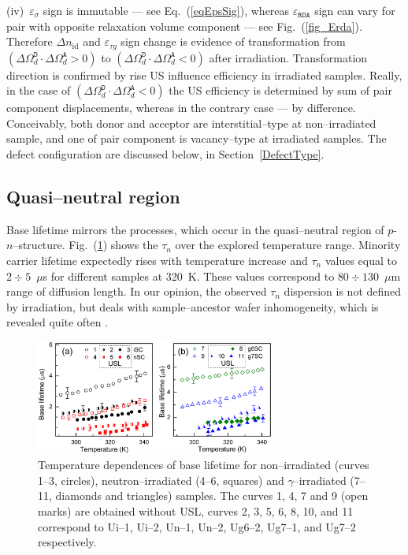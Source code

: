 \documentclass[aip,jap, amsmath,amssymb,reprint]{revtex4-1}
\begin{document}
\noindent
(iv)~$\varepsilon_{\sigma}$ sign is immutable --- see Eq.~(\ref{eqEpsSig}),
whereas $\varepsilon_{\mathtt{RDA}}$ sign can vary for pair with opposite relaxation volume component --- see Fig.~(\ref{fig_Erda}).
Therefore $\Delta n_{\mathrm{id}}$ and $\varepsilon_{\tau g}$ sign change is evidence of transformation
from $(\Delta\Omega_d^\mathtt{D}\cdot\Delta\Omega_d^\mathtt{A}>0)$  to
$(\Delta\Omega_d^\mathtt{D}\cdot\Delta\Omega_d^\mathtt{A}<0)$  after irradiation.
Transformation direction is confirmed by rise US influence efficiency in irradiated samples.
Really, in the case of $(\Delta\Omega_d^\mathtt{D}\cdot\Delta\Omega_d^\mathtt{A}<0)$ the US efficiency is determined by sum of pair component displacements,
whereas in the contrary case  --- by difference.
Conceivably, both donor and acceptor are interstitial--type at non--irradiated sample, and one of pair component is vacancy--type at irradiated samples.
The defect configuration are discussed below, in Section~\ref{DefectType}.


\subsection{Quasi--neutral region\label{Base}}

Base lifetime mirrors the processes, which occur in the quasi--neutral region  of $p$-$n$--structure.
Fig.~(\ref{fig_TAUr}) shows the  $\tau_n$  over the explored temperature range.
Minority carrier lifetime expectedly rises with temperature increase and
$\tau_n$ values equal to $2\div5$~$\mu$s for different samples at 320~K.
These values correspond to $80\div130$~$\mu$m range of diffusion length.
In our opinion, the observed $\tau_n$ dispersion is not defined by irradiation, but deals with sample--ancestor wafer inhomogeneity, which is revealed quite often \cite{Oxide:Chen,Oxide_Schon}.

\begin{figure}
\includegraphics[width=0.7\textwidth]{olikhFig6}%
\caption{\label{fig_TAUr}
Temperature dependences of base lifetime for non--irradiated (curves 1--3, circles),
neutron--irradiated (4--6, squares) and $\gamma$--irradiated (7--11, diamonds and triangles) samples.
The curves 1, 4, 7 and 9 (open marks) are obtained without USL,
curves 2, 3, 5, 6, 8, 10, and 11 correspond to
Ui--1, Ui--2, Un--1, Un--2, Ug6--2, Ug7--1, and Ug7--2 respectively.
}%
\end{figure}
\end{document}
